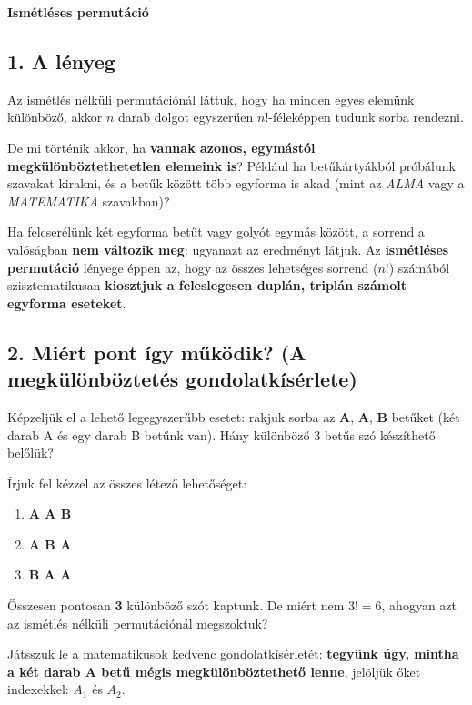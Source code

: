 \documentclass[11pt, a4paper]{article}
\begin{document}
\begin{center}
    \LARGE \textbf{Ismétléses permutáció} \\
    \vspace{0.5cm}
\end{center}

\vspace{0.3cm}

\subsection*{1. A lényeg}
Az ismétlés nélküli permutációnál láttuk, hogy ha minden egyes elemünk különböző, akkor $n$ darab dolgot egyszerűen $n!$-féleképpen tudunk sorba rendezni.

De mi történik akkor, ha \textbf{vannak azonos, egymástól megkülönböztethetetlen elemeink is}? Például ha betűkártyákból próbálunk szavakat kirakni, és a betűk között több egyforma is akad (mint az \textit{ALMA} vagy a \textit{MATEMATIKA} szavakban)?

Ha felcserélünk két egyforma betűt vagy golyót egymás között, a sorrend a valóságban \textbf{nem változik meg}: ugyanazt az eredményt látjuk. Az \textbf{ismétléses permutáció} lényege éppen az, hogy az összes lehetséges sorrend ($n!$) számából szisztematikusan \textbf{kiosztjuk a feleslegesen duplán, triplán számolt egyforma eseteket}.

\subsection*{2. Miért pont így működik? (A megkülönböztetés gondolatkísérlete)}
Képzeljük el a lehető legegyszerűbb esetet: rakjuk sorba az \textbf{A}, \textbf{A}, \textbf{B} betűket (két darab A és egy darab B betűnk van). Hány különböző 3 betűs szó készíthető belőlük? 

Írjuk fel kézzel az összes létező lehetőséget:
\begin{enumerate}
    \item \textbf{A A B}
    \item \textbf{A B A}
    \item \textbf{B A A}
\end{enumerate}
Összesen pontosan \textbf{3} különböző szót kaptunk. De miért nem $3! = 6$, ahogyan azt az ismétlés nélküli permutációnál megszoktuk?

Játsszuk le a matematikusok kedvenc gondolatkísérletét: \textbf{tegyünk úgy, mintha a két darab A betű mégis megkülönböztethető lenne}, jelöljük őket indexekkel: $A_1$ és $A_2$.
\end{document}
